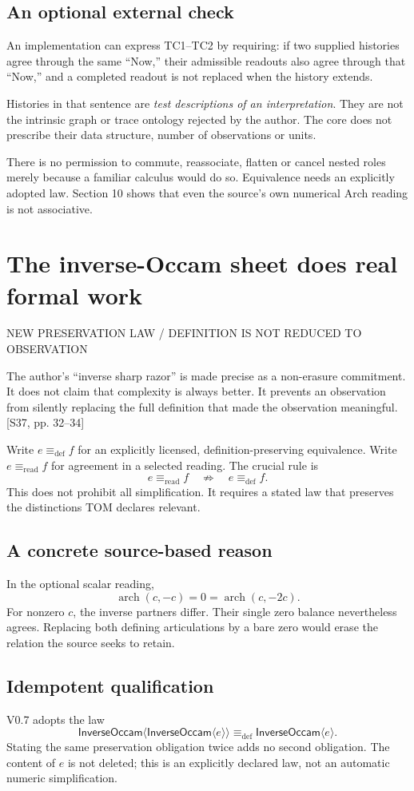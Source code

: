 \documentclass[11pt,a4paper]{article}
\newcommand{\newsec}[2]{\clearpage\section{#1}{\sffamily\footnotesize\color{teal}\MakeUppercase{#2}\par}\vspace{5pt}}
\newcommand{\src}[1]{{\small\color{muted}[S37, #1]}}
\newcommand{\IO}{\mathsf{InverseOccam}}
\newcommand{\ar}{\operatorname{arch}}
\newcommand{\deq}{\mathrel{\equiv_{\mathrm{def}}}}
\newcommand{\readeq}{\mathrel{\equiv_{\mathrm{read}}}}
\newcommand{\bind}[1]{\langle #1\rangle}
\begin{document}
\subsection{An optional external check}
An implementation can express TC1--TC2 by requiring: if two supplied histories agree through the same ``Now,'' their admissible readouts also agree through that ``Now,'' and a completed readout is not replaced when the history extends.

Histories in that sentence are \emph{test descriptions of an interpretation}. They are not the intrinsic graph or trace ontology rejected by the author. The core does not prescribe their data structure, number of observations or units.

\begin{boxx}
There is no permission to commute, reassociate, flatten or cancel nested roles merely because a familiar calculus would do so. Equivalence needs an explicitly adopted law. Section 10 shows that even the source's own numerical Arch reading is not associative.
\end{boxx}

\newsec{The inverse-Occam sheet does real formal work}{New preservation law / definition is not reduced to observation}
The author's ``inverse sharp razor'' is made precise as a non-erasure commitment. It does not claim that complexity is always better. It prevents an observation from silently replacing the full definition that made the observation meaningful. \src{pp. 32--34}

Write $e\deq f$ for an explicitly licensed, definition-preserving equivalence. Write $e\readeq f$ for agreement in a selected reading. The crucial rule is
\[
 \boxed{e\readeq f\quad\not\Longrightarrow\quad e\deq f.}
\]
This does not prohibit all simplification. It requires a stated law that preserves the distinctions TOM declares relevant.

\subsection{A concrete source-based reason}
In the optional scalar reading,
\[
 \ar(c,-c)=0=\ar(c,-2c).
\]
For nonzero $c$, the inverse partners differ. Their single zero balance nevertheless agrees. Replacing both defining articulations by a bare zero would erase the relation the source seeks to retain.

\subsection{Idempotent qualification}
V0.7 adopts the law
\[
 \IO\bind{\IO\bind{e}}\deq\IO\bind{e}.
\]
Stating the same preservation obligation twice adds no second obligation. The content of $e$ is not deleted; this is an explicitly declared law, not an automatic numeric simplification.
\end{document}

